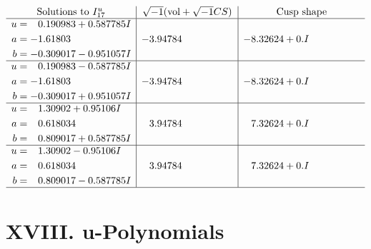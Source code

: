 \documentclass[1p]{elsarticle_modified}
\theoremstyle{definition}
\newcommand{\I}{\sqrt{-1}}
\begin{document}
$$\begin{array}{c|c|c}  
\text{Solutions to }I^u_{17}& \I (\text{vol} + \sqrt{-1}CS) & \text{Cusp shape}\\
 \hline 
\begin{aligned}
u &= \phantom{-}0.190983 + 0.587785 I \\
a &= -1.61803\phantom{ +0.000000I} \\
b &= -0.309017 - 0.951057 I\end{aligned}
 & -3.94784\phantom{ +0.000000I} & -8.32624 + 0. I\phantom{ +0.000000I} \\ \hline\begin{aligned}
u &= \phantom{-}0.190983 - 0.587785 I \\
a &= -1.61803\phantom{ +0.000000I} \\
b &= -0.309017 + 0.951057 I\end{aligned}
 & -3.94784\phantom{ +0.000000I} & -8.32624 + 0. I\phantom{ +0.000000I} \\ \hline\begin{aligned}
u &= \phantom{-}1.30902 + 0.95106 I \\
a &= \phantom{-}0.618034\phantom{ +0.000000I} \\
b &= \phantom{-}0.809017 + 0.587785 I\end{aligned}
 & \phantom{-}3.94784\phantom{ +0.000000I} & \phantom{-}7.32624 + 0. I\phantom{ +0.000000I} \\ \hline\begin{aligned}
u &= \phantom{-}1.30902 - 0.95106 I \\
a &= \phantom{-}0.618034\phantom{ +0.000000I} \\
b &= \phantom{-}0.809017 - 0.587785 I\end{aligned}
 & \phantom{-}3.94784\phantom{ +0.000000I} & \phantom{-}7.32624 + 0. I\phantom{ +0.000000I}\\
 \hline 
 \end{array}$$\newpage
\newpage\renewcommand{\arraystretch}{1}
\centering \section*{ XVIII. u-Polynomials}
\end{document}
